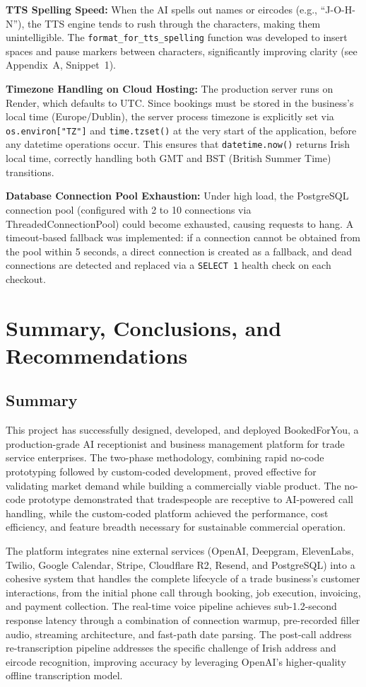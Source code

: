 \documentclass[conference]{IEEEtran}
\begin{document}
\textbf{TTS Spelling Speed:} When the AI spells out names or eircodes (e.g., ``J-O-H-N''), the TTS engine tends to rush through the characters, making them unintelligible. The \texttt{format\_for\_tts\_spelling} function was developed to insert spaces and pause markers between characters, significantly improving clarity (see Appendix~A, Snippet~1).

\textbf{Timezone Handling on Cloud Hosting:} The production server runs on Render, which defaults to UTC. Since bookings must be stored in the business's local time (Europe/Dublin), the server process timezone is explicitly set via \texttt{os.environ["TZ"]} and \texttt{time.tzset()} at the very start of the application, before any datetime operations occur. This ensures that \texttt{datetime.now()} returns Irish local time, correctly handling both GMT and BST (British Summer Time) transitions.

\textbf{Database Connection Pool Exhaustion:} Under high load, the PostgreSQL connection pool (configured with 2 to 10 connections via ThreadedConnectionPool) could become exhausted, causing requests to hang. A timeout-based fallback was implemented: if a connection cannot be obtained from the pool within 5 seconds, a direct connection is created as a fallback, and dead connections are detected and replaced via a \texttt{SELECT 1} health check on each checkout.


\section{Summary, Conclusions, and Recommendations}

\subsection{Summary}

This project has successfully designed, developed, and deployed BookedForYou, a production-grade AI receptionist and business management platform for trade service enterprises. The two-phase methodology, combining rapid no-code prototyping followed by custom-coded development, proved effective for validating market demand while building a commercially viable product. The no-code prototype demonstrated that tradespeople are receptive to AI-powered call handling, while the custom-coded platform achieved the performance, cost efficiency, and feature breadth necessary for sustainable commercial operation.

The platform integrates nine external services (OpenAI, Deepgram, ElevenLabs, Twilio, Google Calendar, Stripe, Cloudflare R2, Resend, and PostgreSQL) into a cohesive system that handles the complete lifecycle of a trade business's customer interactions, from the initial phone call through booking, job execution, invoicing, and payment collection. The real-time voice pipeline achieves sub-1.2-second response latency through a combination of connection warmup, pre-recorded filler audio, streaming architecture, and fast-path date parsing. The post-call address re-transcription pipeline addresses the specific challenge of Irish address and eircode recognition, improving accuracy by leveraging OpenAI's higher-quality offline transcription model.
\end{document}
